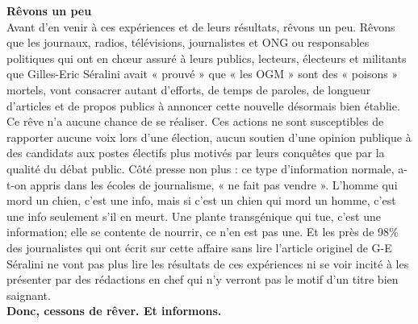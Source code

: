 \documentclass[8pt]{article}
\begin{document}
\textbf{Rêvons un peu}\\

Avant d’en venir à ces expériences et de leurs résultats, rêvons un peu. Rêvons que les journaux, radios, télévisions, journalistes et ONG ou responsables politiques qui ont en chœur assuré à leurs publics, lecteurs, électeurs et militants que Gilles-Eric Séralini avait « prouvé » que « les OGM » sont des « poisons » mortels, vont consacrer autant d’efforts, de temps de paroles, de longueur d’articles et de propos publics à annoncer cette nouvelle  désormais bien établie.\\

Ce rêve n’a aucune chance de se réaliser. Ces actions ne sont susceptibles de rapporter aucune voix lors d’une élection, aucun soutien d’une opinion publique à des candidats aux postes électifs plus motivés par leurs conquêtes que par la qualité du débat public. Côté presse non plus : ce type d’information normale, a-t-on appris dans les écoles de journalisme, « ne fait pas vendre ». L’homme qui mord un chien, c’est une info, mais si c’est un chien qui mord un homme, c’est une info seulement s’il en meurt. Une plante transgénique qui tue, c’est une information; elle se contente de nourrir, ce n’en est pas une. Et les près de 98\% des journalistes qui ont écrit sur cette affaire sans lire l’article originel de G-E Séralini ne vont pas plus lire les résultats de ces expériences ni se voir incité à les présenter par des rédactions en chef qui n’y verront pas le motif d’un titre bien saignant.\\

\textbf{Donc, cessons de rêver. Et informons.}\\
\end{document}
